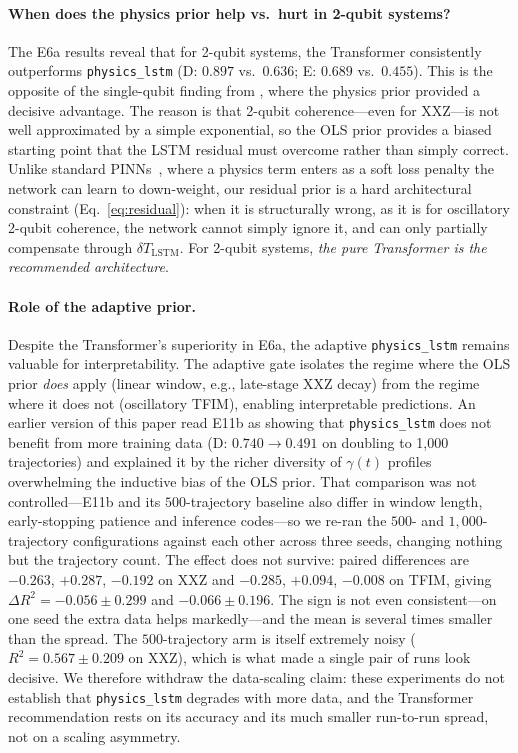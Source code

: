 \documentclass[twocolumn,10pt]{article}
\begin{document}
\paragraph{When does the physics prior help vs.\ hurt in 2-qubit systems?}
The E6a results reveal that for 2-qubit systems, the Transformer
consistently outperforms \texttt{physics\_lstm} (D: $0.897$ vs.\ $0.636$;
E: $0.689$ vs.\ $0.455$).
This is the opposite of the single-qubit finding from \cite{Paper1Brusnikin},
where the physics prior provided a decisive advantage.
The reason is that 2-qubit coherence---even for XXZ---is not well
approximated by a simple exponential, so the OLS prior provides a
biased starting point that the LSTM residual must overcome rather than
simply correct.
Unlike standard PINNs~\cite{Raissi2019}, where a physics term enters as
a soft loss penalty the network can learn to down-weight, our residual
prior is a hard architectural constraint (Eq.~\ref{eq:residual}): when
it is structurally wrong, as it is for oscillatory 2-qubit coherence,
the network cannot simply ignore it, and can only partially compensate
through $\delta T_\mathrm{LSTM}$.
For 2-qubit systems, \emph{the pure Transformer is the recommended
architecture}.

\paragraph{Role of the adaptive prior.}
Despite the Transformer's superiority in E6a, the adaptive
\texttt{physics\_lstm} remains valuable for interpretability.
The adaptive gate isolates the regime where the OLS prior
\emph{does} apply (linear window, e.g., late-stage XXZ decay) from the
regime where it does not (oscillatory TFIM), enabling interpretable
predictions.
An earlier version of this paper read E11b as showing that
\texttt{physics\_lstm} does not benefit from more training data
(D: $0.740 \to 0.491$ on doubling to 1{,}000 trajectories) and explained
it by the richer diversity of $\gamma(t)$ profiles overwhelming the
inductive bias of the OLS prior.
That comparison was not controlled---E11b and its $500$-trajectory
baseline also differ in window length, early-stopping patience and
inference codes---so we re-ran the $500$- and $1{,}000$-trajectory
configurations against each other across three seeds, changing nothing
but the trajectory count.
The effect does not survive: paired differences are $-0.263$, $+0.287$,
$-0.192$ on XXZ and $-0.285$, $+0.094$, $-0.008$ on TFIM, giving
$\Delta R^2 = -0.056 \pm 0.299$ and $-0.066 \pm 0.196$.
The sign is not even consistent---on one seed the extra data helps
markedly---and the mean is several times smaller than the spread.
The $500$-trajectory arm is itself extremely noisy
($R^2 = 0.567 \pm 0.209$ on XXZ), which is what made a single pair of
runs look decisive.
We therefore withdraw the data-scaling claim: these experiments do not
establish that \texttt{physics\_lstm} degrades with more data, and the
Transformer recommendation rests on its accuracy and its much smaller
run-to-run spread, not on a scaling asymmetry.
\end{document}
